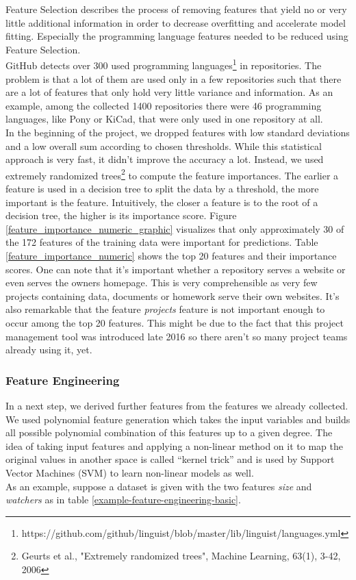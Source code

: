 \documentclass[%
a4paper,
DIV12,
2.5headlines,
bigheadings,
titlepage,
openbib,
]{scrartcl}
\begin{document}
Feature Selection describes the process of removing features that yield no or very little additional information in order to decrease overfitting and accelerate model fitting.
Especially the programming language features needed to be reduced using Feature Selection.\\
GitHub detects over 300 used programming languages\footnote{https://github.com/github/linguist/blob/master/lib/linguist/languages.yml} in repositories.
The problem is that a lot of them are used only in a few repositories such that there are a lot of features that only hold very little variance and information.
As an example, among the collected 1400 repositories there were 46 programming languages, like Pony or KiCad, that were only used in one repository at all.\\
In the beginning of the project, we dropped features with low standard deviations and a low overall sum according to chosen thresholds.
While this statistical approach is very fast, it didn't improve the accuracy a lot.
Instead, we used extremely randomized trees\footnote{Geurts et al., "Extremely randomized trees", Machine Learning, 63(1), 3-42, 2006} to compute the feature importances.
The earlier a feature is used in a decision tree to split the data by a threshold, the more important is the feature.
Intuitively, the closer a feature is to the root of a decision tree, the higher is its importance score.
Figure \ref{feature_importance_numeric_graphic} visualizes that only approximately 30 of the 172 features of the training data were important for predictions.
Table \ref{feature_importance_numeric} shows the top 20 features and their importance scores.
One can note that it's important whether a repository serves a website or even serves the owners homepage.
This is very comprehensible as very few projects containing data, documents or homework serve their own websites.
It's also remarkable that the feature \textit{projects} feature is not important enough to occur among the top 20 features.
This might be due to the fact that this project management tool was introduced late 2016 so there aren't so many project teams already using it, yet.

\subsubsection{Feature Engineering}\label{feature-engineering}

In a next step, we derived further features from the features we already collected.
We used polynomial feature generation which takes the input variables and builds all possible polynomial combination of this features up to a given degree.
The idea of taking input features and applying a non-linear method on it to map the original values in another space is called ``kernel trick'' and is used by Support Vector Machines (SVM) to learn non-linear models as well.\\
As an example, suppose a dataset is given with the two features \textit{size} and \textit{watchers} as in table \ref{example-feature-engineering-basic}.
\end{document}
